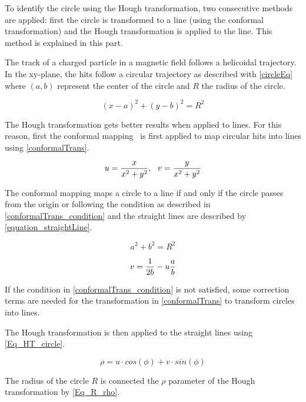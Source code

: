 To identify the circle using the Hough transformation, two consecutive methods are applied: first the circle is transformed to a line (using the conformal transformation) and the Hough transformation is applied to the line. This method is explained in this part.

The track of a charged particle in a magnetic field follows a helicoidal trajectory. In the xy-plane, the hits follow a circular trajectory as described with \cref{circleEq} where $(a, b)$ represent the center of the circle and $R$ the radius of the circle.

\begin{equation}
  {(x-a)}^2 + {(y-b)}^2 = R^2
	\label{circleEq}
\end{equation}

The Hough transformation gets better results when applied to lines. For this reason, first the conformal mapping~\cite{Hansroul:1988wa} is first applied to map circular hits into lines using \cref{conformalTrans}.

\begin{equation}
  u = {{x} \over {x^2+y^2}} , \,\,\,\, v = {{y} \over {x^2+y^2}}
	\label{conformalTrans}
\end{equation}

The conformal mapping maps a circle to a line if and only if the circle passes from the origin or following the condition as described in \cref{conformalTrans_condition} and the straight lines are described by \cref{equation_straightLine}.

\begin{equation}
  a^2 + b^2 = R^2
	\label{conformalTrans_condition}
\end{equation}

\begin{equation}
  v = {1 \over {2b}} - u {a \over b}
	\label{equation_straightLine}
\end{equation}

If the condition in \cref{conformalTrans_condition} is not satisfied, some correction terms are needed for the transformation in \cref{conformalTrans} to transform circles into lines.

The Hough transformation is then applied to the straight lines using \cref{Eq_HT_circle}.

\begin{equation}
	\rho = u \cdot cos(\phi) + v \cdot sin(\phi)
	\label{Eq_HT_circle}
\end{equation}

The radius of the circle $R$ is connected the $\rho$ parameter of the Hough transformation by \cref{Eq_R_rho}.


